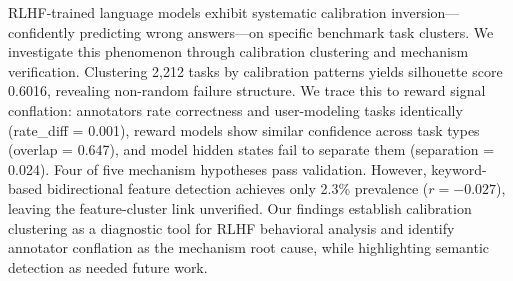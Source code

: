 RLHF-trained language models exhibit systematic calibration inversion---confidently predicting wrong answers---on specific benchmark task clusters. We investigate this phenomenon through calibration clustering and mechanism verification. Clustering 2,212 tasks by calibration patterns yields silhouette score 0.6016, revealing non-random failure structure. We trace this to reward signal conflation: annotators rate correctness and user-modeling tasks identically (rate\_diff = 0.001), reward models show similar confidence across task types (overlap = 0.647), and model hidden states fail to separate them (separation = 0.024). Four of five mechanism hypotheses pass validation. However, keyword-based bidirectional feature detection achieves only 2.3\% prevalence ($r = -0.027$), leaving the feature-cluster link unverified. Our findings establish calibration clustering as a diagnostic tool for RLHF behavioral analysis and identify annotator conflation as the mechanism root cause, while highlighting semantic detection as needed future work.
